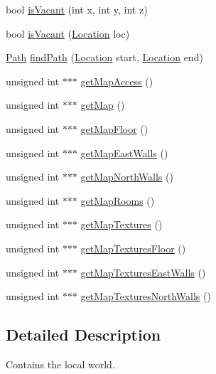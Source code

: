 \begin{DoxyCompactItemize}
\item 
bool \hyperlink{classShipMap_af80dd87cdd6c203a0870c3cbdb498418}{is\-Vacant} (int x, int y, int z)
\item 
bool \hyperlink{classShipMap_a0c89267eede90614d46a33cd7129b1d0}{is\-Vacant} (\hyperlink{structLocation}{Location} loc)
\item 
\hyperlink{classPath}{Path} \hyperlink{classShipMap_ac66dd983ca92d5e3d0696f2a25da90e1}{find\-Path} (\hyperlink{structLocation}{Location} start, \hyperlink{structLocation}{Location} end)
\item 
unsigned int $\ast$$\ast$$\ast$ \hyperlink{classShipMap_a2281c139f8f1d4a9023cbfc7a8ebc5f9}{get\-Map\-Access} ()
\item 
unsigned int $\ast$$\ast$$\ast$ \hyperlink{classShipMap_abde984e7f9b9172965e58157981857ae}{get\-Map} ()
\item 
unsigned int $\ast$$\ast$$\ast$ \hyperlink{classShipMap_a5ab9f1b8d8a8efb91dbc1555ddd835da}{get\-Map\-Floor} ()
\item 
unsigned int $\ast$$\ast$$\ast$ \hyperlink{classShipMap_a2272771cebf1ad7459d87108bcce9fa8}{get\-Map\-East\-Walls} ()
\item 
unsigned int $\ast$$\ast$$\ast$ \hyperlink{classShipMap_a85804cf36ce82bbcc1722732deaea2f5}{get\-Map\-North\-Walls} ()
\item 
unsigned int $\ast$$\ast$$\ast$ \hyperlink{classShipMap_a96d0a84da234e73df2d0a44531da71e7}{get\-Map\-Rooms} ()
\item 
unsigned int $\ast$$\ast$$\ast$ \hyperlink{classShipMap_a4de11bdb01a85083627dc41016967bce}{get\-Map\-Textures} ()
\item 
unsigned int $\ast$$\ast$$\ast$ \hyperlink{classShipMap_a3701cc7e75f89719e2c137203b3ada7f}{get\-Map\-Textures\-Floor} ()
\item 
unsigned int $\ast$$\ast$$\ast$ \hyperlink{classShipMap_a6b16ec5869e5cb347d847c975b3fd01f}{get\-Map\-Textures\-East\-Walls} ()
\item 
unsigned int $\ast$$\ast$$\ast$ \hyperlink{classShipMap_aecdbc1ca649c823dc139aefcce416ebb}{get\-Map\-Textures\-North\-Walls} ()
\end{DoxyCompactItemize}


\subsection{Detailed Description}
Contains the local world. 




